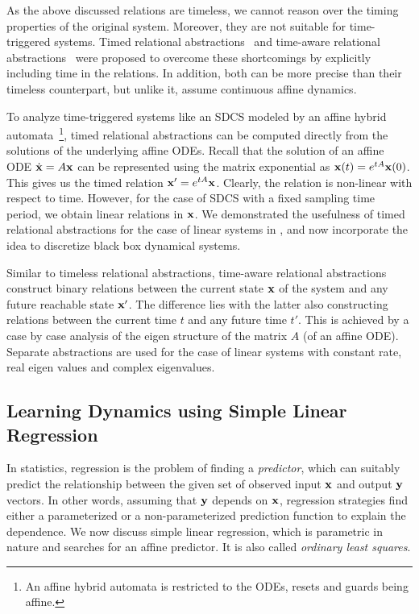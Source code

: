 
As the above discussed relations are timeless, we cannot reason over
the timing properties of the original system. Moreover, they are not
suitable for time-triggered systems. Timed relational
abstractions~\cite{zutshi2012timed} and time-aware relational
abstractions~\cite{mover2013time} were proposed to overcome these
shortcomings by explicitly including time in the relations. In
addition, both can be more precise than their timeless counterpart,
but unlike it, assume continuous affine dynamics.

To analyze time-triggered systems like an SDCS modeled by an affine
hybrid automata~\footnote{An affine hybrid automata is restricted to
the ODEs, resets and guards being affine.}, timed relational
abstractions can be computed directly from the solutions of the
underlying affine ODEs.  Recall that the solution of an affine ODE
$\dot{\mathbf{x}} = A\mathbf{x}$ can be represented using the matrix exponential as
$\mathbf{x}(t) = e^{tA}\mathbf{x}(0)$. This gives us the timed relation $\mathbf{x}' =
e^{tA}\mathbf{x}$.  Clearly, the relation is non-linear with respect to time.
However, for the case of SDCS with a fixed sampling time period, we
obtain linear relations in $\mathbf{x}$.  We demonstrated the usefulness of
timed relational abstractions for the case of linear systems
in \cite{zutshi2012timed}, and now incorporate the idea to discretize
black box dynamical systems.

Similar to timeless relational abstractions, time-aware relational
abstractions \cite{mover2013time} construct binary relations between
the current state $\mathbf{x}$ of the system and any future reachable state
$\mathbf{x}'$. The difference lies with the latter also constructing relations
between the current time $t$ and any future time $t'$. This is
achieved by a case by case analysis of the eigen structure of the
matrix $A$ (of an affine ODE). Separate abstractions are used for the
case of linear systems with constant rate, real eigen values and complex eigenvalues.

\subsection{Learning Dynamics using Simple Linear Regression}


In statistics, regression is the problem of finding a
\textit{predictor}, which can suitably predict the relationship
between the given set of observed input $\mathbf{x}$ and output $\mathbf{y}$ vectors.
In other words, assuming that $\mathbf{y}$ depends on $\mathbf{x}$, regression
strategies find either a parameterized or a non-parameterized
prediction function to explain the dependence. We now discuss simple
linear regression, which is parametric in nature and searches for an
affine predictor. It is also called \textit{ordinary least squares}.

